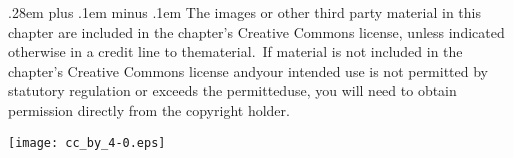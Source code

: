 \documentclass[runningheads]{llncs}
\begin{document}
{\small \spaceskip .28em plus .1em minus .1em The images or other
third party material in this chapter are included in the\break
chapter's Creative Commons license, unless indicated otherwise in a
credit line to the\break material.~If material is not included in
the chapter's Creative Commons license and\break your intended use
is not permitted by statutory regulation or exceeds the
permitted\break use, you will need to obtain permission directly
from the copyright holder.}

\medskip\noindent\texttt{[image: cc\_by\_4-0.eps]}
\fi
\end{document}
